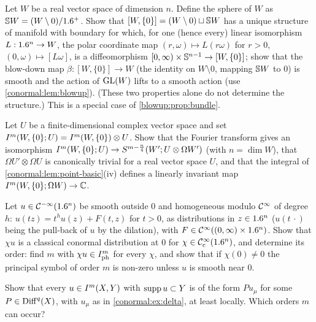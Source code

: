 \begin{exercise}\label{conormal:ex:blowup}
  Let $W$ be a real vector space of dimension $n$.  Define the sphere of $W$ as
  $\mathbb{S} W=(W\setminus0)/1.6^+$.  Show that $[W,\{0\}]=(W\setminus0)\sqcup\mathbb{S} W$
  has a unique structure of manifold with boundary for which, for one (hence every)
  linear isomorphism $L:1.6^n\to W$, the polar coordinate map $(r,\omega)\mapsto
  L(r\omega)$ for $r>0$, $(0,\omega)\mapsto[L\omega]$, is a diffeomorphism
  $[0,\infty)\times\mathbb{S}^{n-1}\to[W,\{0\}]$; show that the blow-down map $\beta:[W,\{0\}]\to
  W$ (the identity on $W\setminus0$, mapping $\mathbb{S} W$ to $0$) is smooth and the
  action of $\operatorname{GL}(W)$ lifts to a smooth action (use \cref{conormal:lem:blowup}).
  (These two properties alone do not determine the structure.)
  This is a special case of \cref{blowup:prop:bundle}.
\end{exercise}

\begin{exercise}\label{conormal:ex:valued}
  Let $U$ be a finite-dimensional complex vector space and set
  $I^{m}(W,\{0\};U)=I^{m}(W,\{0\})\otimes U$.  Show that the Fourier transform
  gives an isomorphism $I^{m}(W,\{0\};U)\to S^{m-\frac n4}(W';U\otimes\Omega W')$
  (with $n=\dim W$), that $\Omega U'\otimes\Omega U$ is canonically trivial for a
  real vector space $U$, and that the integral of
  \cref{conormal:lem:point-basic}(iv) defines a linearly invariant map
  $I^{m}(W,\{0\};\Omega W)\to\mathbb{C}$.
\end{exercise}

\begin{exercise}\label{conormal:ex:homog}
  Let $u\in\mathcal{C}^{-\infty}(1.6^n)$ be smooth outside $0$ and homogeneous modulo $\mathcal{C}^\infty$ of
  degree $h$: $u(tz)=t^hu(z)+F(t,z)$ for $t>0$, as distributions in $z\in1.6^n$
  ($u(t\,\cdot)$ being the pull-back of $u$ by the dilation), with
  $F\in\mathcal{C}^\infty((0,\infty)\times1.6^n)$.  Show that $\chi u$ is a classical conormal
  distribution at $0$ for $\chi\in\mathcal{C}^\infty_{\mathrm{c}}(1.6^n)$, and determine its order: find
  $m$ with $\chi u\in I^{m}_{\mathrm{ph}}$ for every $\chi$, and show that if
  $\chi(0)\ne0$ the principal symbol of order $m$ is non-zero unless $u$ is
  smooth near $0$.
\end{exercise}

\begin{exercise}\label{conormal:ex:supported}
  Show that every $u\in I^{m}(X,Y)$ with $\operatorname{supp} u\subset Y$ is of the form $Pu_\mu$
  for some $P\in\operatorname{Diff}^{q}(X)$, with $u_\mu$ as in \cref{conormal:ex:delta}, at
  least locally.  Which orders $m$ can occur?
\end{exercise}

